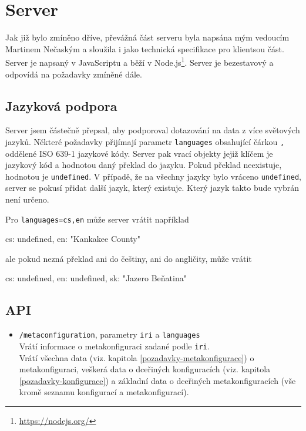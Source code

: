 \chapter{Server}
Jak již bylo zmíněno dříve, převážná část serveru byla napsána mým vedoucím Martinem Nečaským a sloužila i jako technická specifikace pro klientsou část. Server je napsaný v JavaScriptu a běží v Node.js\footnote{\url{https://nodejs.org/}}. Server je bezestavový a odpovídá na požadavky zmíněné dále.

\section{Jazyková podpora}
Server jsem částečně přepsal, aby podporoval dotazování na data z více světových jazyků. Některé požadavky přijímají parametr \texttt{languages} obsahující čárkou \texttt{,} oddělené ISO 639-1 jazykové kódy. Server pak vrací objekty jejiž klíčem je jazykový kód a hodnotou daný překlad do jazyku. Pokud překlad neexistuje, hodnotou je \texttt{undefined}. V případě, že na všechny jazyky bylo vráceno \texttt{undefined}, server se pokusí přidat další jazyk, který existuje. Který jazyk takto bude vybrán není určeno.

\begin{prikl}
Pro \texttt{languages=cs,en} může server vrátit například
\begin{code}[frame=none]
{
    cs: undefined,
    en: "Kankakee County"
}
\end{code}
ale pokud nezná překlad ani do češtiny, ani do angličity, může vrátit
\begin{code}[frame=none]
{
    cs: undefined,
    en: undefined,
    sk: "Jazero Beňatina"
}
\end{code}
\end{prikl}

\section{API}
\begin{itemize}
    \item \texttt{/metaconfiguration}, parametry \texttt{iri} a \texttt{languages} \\
    Vrátí informace o metakonfiguraci zadané podle \texttt{iri}. \\
    Vrátí všechna data (viz. kapitola \ref{pozadavky-metakonfigurace}) o metakonfiguraci, veškerá data o dceřiných konfiguracích (viz. kapitola \ref{pozadavky-konfigurace}) a základní data o dceřiných metakonfiguracích (vše kromě seznamu konfigurací a metakonfigurací).
\end{itemize}